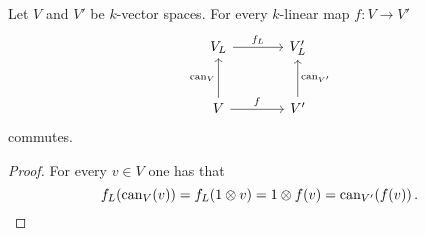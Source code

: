 \begin{lemma}
  \label{lemma: abstract description of fL}
  Let $V$ and $V'$ be $k$-vector spaces.
  For every $k$-linear map $f \colon V \to V'$
  \[
    \begin{tikzcd}[sep = large]
        V_L
        \arrow{r}[above]{f_L}
      & V'_L
      \\
        V
        \arrow{r}[above]{f}
        \arrow{u}[left]{\can_V}
      & V'
        \arrow{u}[right]{\can_{V'}}
    \end{tikzcd}
  \]
  commutes.
\end{lemma}
\begin{proof}
  For every $v \in V$ one has that
  \[
          f_L(\operatorname{can}_V(v))
      =  f_L(1 \otimes v)
      =  1 \otimes f(v)
      =  \operatorname{can}_{V'}(f(v)) \,.
    \qedhere
  \]
\end{proof}


